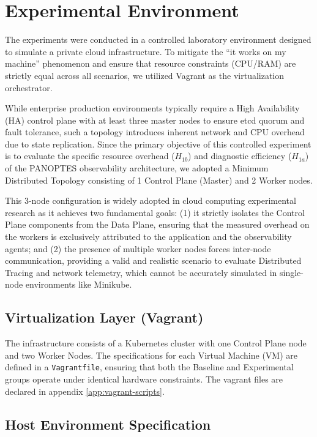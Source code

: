 \section{Experimental Environment}
\label{sec:experimental-environment}

The experiments were conducted in a controlled laboratory environment designed to simulate a private cloud infrastructure. To mitigate the ``it works on my machine'' phenomenon and ensure that resource constraints (CPU/RAM) are strictly equal across all scenarios, we utilized Vagrant as the virtualization orchestrator.

While enterprise production environments typically require a High Availability (HA) control plane with at least three master nodes \cite{brendan_tracey_2018} to ensure etcd quorum and fault tolerance, such a topology introduces inherent network and CPU overhead due to state replication. Since the primary objective of this controlled experiment is to evaluate the specific resource overhead ($H_{1b}$) and diagnostic efficiency ($H_{1a}$) of the PANOPTES observability architecture, we adopted a Minimum Distributed Topology consisting of 1 Control Plane (Master) and 2 Worker nodes.

This 3-node configuration is widely adopted in cloud computing experimental research as it achieves two fundamental goals: (1) it strictly isolates the Control Plane components from the Data Plane, ensuring that the measured overhead on the workers is exclusively attributed to the application and the observability agents; and (2) the presence of multiple worker nodes forces inter-node communication, providing a valid and realistic scenario to evaluate Distributed Tracing and network telemetry, which cannot be accurately simulated in single-node environments like Minikube.

\subsection{Virtualization Layer (Vagrant)}
The infrastructure consists of a Kubernetes cluster with one Control Plane node and two Worker Nodes. The specifications for each Virtual Machine (VM) are defined in a \texttt{Vagrantfile}, ensuring that both the Baseline and Experimental groups operate under identical hardware constraints. The vagrant files are declared in appendix \ref{app:vagrant-scripts}.



\subsection{Host Environment Specification}
\label{subsec:host-environment}


